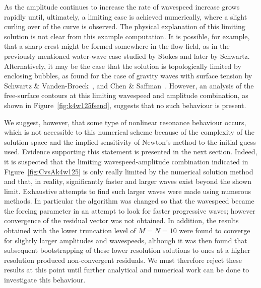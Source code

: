 As the amplitude continues to increase the rate of wavespeed increase grows rapidly until, ultimately, a limiting case is achieved numerically, where a slight curling over of the curve is observed. The physical explanation of this limiting solution is not clear from this example computation. It is possible, for example, that a sharp crest might be formed somewhere in the flow field, as in the previously mentioned water-wave case studied by Stokes and later by Schwartz. Alternatively, it may be the case that the solution is topologically limited by enclosing bubbles, as found for the case of gravity waves with surface tension by Schwartz \& Vanden-Broeck~\cite{Schwartz:NSE}, and Chen \& Saffman~\cite{Chen:SGC}. However, an analysis of the free-surface contours at this limiting wavespeed and amplitude combination, as shown in Figure~\ref{fig:k4w125fsend}, suggests that no such behaviour is present. 

We suggest, however, that some type of nonlinear resonance behaviour occurs, which is not accessible to this numerical scheme because of the complexity of the solution space and the  implied sensitivity of Newton's method to the initial guess used. Evidence supporting this statement is presented in the next section. Indeed, it is suspected that the limiting wavespeed-amplitude combination indicated in Figure~\ref{fig:CvsAk4w125} is only really limited by the numerical solution method and that, in reality, significantly faster and larger waves exist beyond the shown limit. Exhaustive attempts to find such larger waves were made using numerous methods. In particular the algorithm was changed so that the wavespeed became the forcing parameter in an attempt to look for faster progressive waves; however convergence of the residual vector was not obtained. In addition, the results obtained with the lower truncation level of $M=N=10$ were found to converge for slightly larger amplitudes and wavespeeds, although it was then found that subsequent bootstrapping of these lower resolution solutions to ones at a higher resolution produced non-convergent residuals. We must therefore reject these results at this point until further analytical and numerical work can be done to investigate this behaviour.

